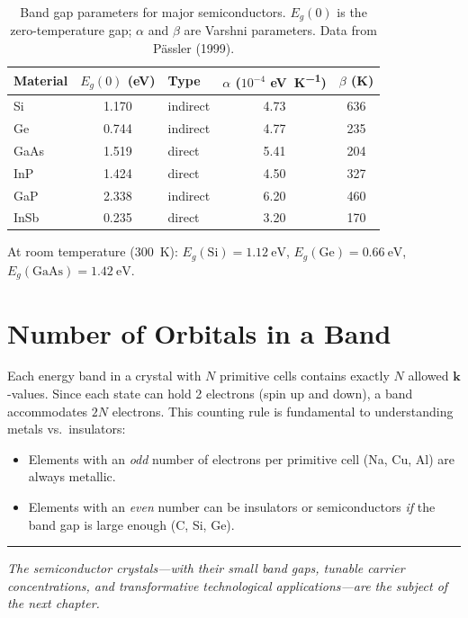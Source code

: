 \begin{table}[H]
\centering
\caption{Band gap parameters for major semiconductors. $E_g(0)$ is the zero-temperature gap; $\alpha$ and $\beta$ are Varshni parameters. Data from P\"assler (1999).}
\label{tab:bandgap}
\begin{tabular}{@{}lSlSS@{}}
\toprule
Material & {$E_g(0)$ (\si{\electronvolt})} & Type & {$\alpha$ ($10^{-4}$ \si{\electronvolt\per\kelvin})} & {$\beta$ (\si{\kelvin})} \\
\midrule
Si   & 1.170 & indirect & 4.73  & 636 \\
Ge   & 0.744 & indirect & 4.77  & 235 \\
GaAs & 1.519 & direct   & 5.41  & 204 \\
InP  & 1.424 & direct   & 4.50  & 327 \\
GaP  & 2.338 & indirect & 6.20  & 460 \\
InSb & 0.235 & direct   & 3.20  & 170 \\
\bottomrule
\end{tabular}
\end{table}

At room temperature (\SI{300}{\kelvin}): $E_g(\text{Si}) = \SI{1.12}{\electronvolt}$, $E_g(\text{Ge}) = \SI{0.66}{\electronvolt}$, $E_g(\text{GaAs}) = \SI{1.42}{\electronvolt}$.

\section{Number of Orbitals in a Band}

Each energy band in a crystal with $N$ primitive cells contains exactly $N$ allowed $\mathbf{k}$-values. Since each state can hold 2 electrons (spin up and down), a band accommodates $2N$ electrons. This counting rule is fundamental to understanding metals vs.\ insulators:
\begin{itemize}[nosep]
  \item Elements with an \textit{odd} number of electrons per primitive cell (Na, Cu, Al) are always metallic.
  \item Elements with an \textit{even} number can be insulators or semiconductors \textit{if} the band gap is large enough (C, Si, Ge).
\end{itemize}

\vspace{1cm}
\noindent\rule{\textwidth}{0.4pt}
\textit{The semiconductor crystals---with their small band gaps, tunable carrier concentrations, and transformative technological applications---are the subject of the next chapter.}

